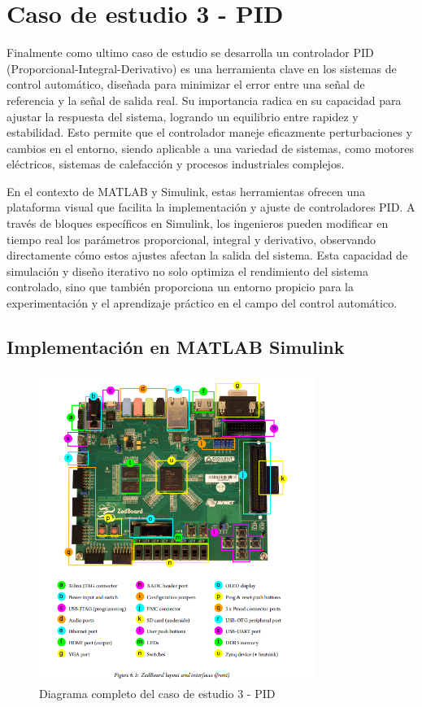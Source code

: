 \section{Caso de estudio 3 - PID}

Finalmente como ultimo caso de estudio se desarrolla un controlador PID (Proporcional-Integral-Derivativo) es una herramienta clave en los sistemas de control automático, diseñada para minimizar el error entre una señal de referencia y la señal de salida real. Su importancia radica en su capacidad para ajustar la respuesta del sistema, logrando un equilibrio entre rapidez y estabilidad. Esto permite que el controlador maneje eficazmente perturbaciones y cambios en el entorno, siendo aplicable a una variedad de sistemas, como motores eléctricos, sistemas de calefacción y procesos industriales complejos.

En el contexto de MATLAB y Simulink, estas herramientas ofrecen una plataforma visual que facilita la implementación y ajuste de controladores PID. A través de bloques específicos en Simulink, los ingenieros pueden modificar en tiempo real los parámetros proporcional, integral y derivativo, observando directamente cómo estos ajustes afectan la salida del sistema. Esta capacidad de simulación y diseño iterativo no solo optimiza el rendimiento del sistema controlado, sino que también proporciona un entorno propicio para la experimentación y el aprendizaje práctico en el campo del control automático.


\subsection{Implementación en MATLAB Simulink}

\begin{figure}[h!]
    \centering
    \includegraphics[width=0.8\textwidth]{fig/especifico_2/154140ZedBoard.png}
    \caption{Diagrama completo del caso de estudio 3 - PID }
    \label{fig:caso_de_estudio_3_PID}
\end{figure}



